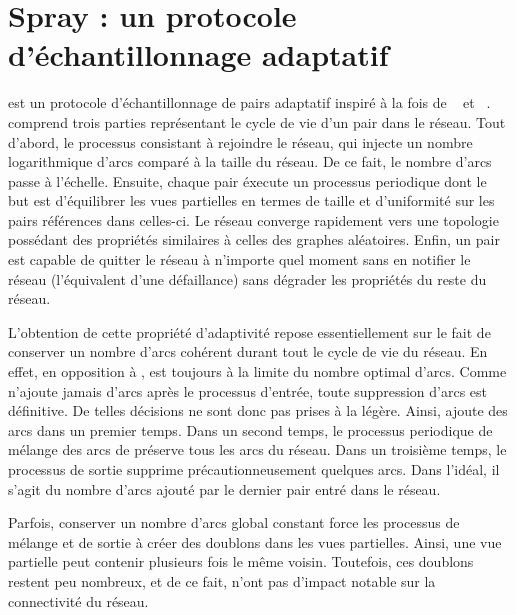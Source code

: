 
\chapter{Spray : un protocole d'échantillonnage adaptatif}
\label{net:chap:spray}
\minitoc

\SPRAY est un protocole d'échantillonnage de pairs adaptatif inspiré à la fois
de \SCAMP~\cite{ganesh2003peer} et \CYCLON~\cite{voulgaris2005cyclon}. \SPRAY
comprend trois parties représentant le cycle de vie d'un pair dans le
réseau. Tout d'abord, le processus consistant à rejoindre le réseau, qui injecte
un nombre logarithmique d'arcs comparé à la taille du réseau. De ce fait, le
nombre d'arcs passe à l'échelle. Ensuite, chaque pair éxecute un processus
periodique dont le but est d'équilibrer les vues partielles en termes de taille
et d'uniformité sur les pairs références dans celles-ci. Le réseau converge
rapidement vers une topologie possédant des propriétés similaires à celles des
graphes aléatoires. Enfin, un pair est capable de quitter le réseau à n'importe
quel moment sans en notifier le réseau (l'équivalent d'une défaillance) sans
dégrader les propriétés du reste du réseau.

L'obtention de cette propriété d'adaptivité repose essentiellement sur le fait
de conserver un nombre d'arcs cohérent durant tout le cycle de vie du réseau.
En effet, en opposition à \CYCLON, \SPRAY est toujours à la limite du nombre
optimal d'arcs. Comme \SPRAY n'ajoute jamais d'arcs après le processus d'entrée,
toute suppression d'arcs est définitive. De telles décisions ne sont donc pas
prises à la légère. Ainsi, \SPRAY ajoute des arcs dans un premier temps. Dans un
second temps, le processus periodique de mélange des arcs de \SPRAY préserve
tous les arcs du réseau.  Dans un troisième temps, le processus de sortie
supprime précautionneusement quelques arcs. Dans l'idéal, il s'agit du nombre
d'arcs ajouté par le dernier pair entré dans le réseau.

Parfois, conserver un nombre d'arcs global constant force les processus de
mélange et de sortie à créer des doublons dans les vues partielles. Ainsi, une
vue partielle peut contenir plusieurs fois le même voisin. Toutefois, ces
doublons restent peu nombreux, et de ce fait, n'ont pas d'impact notable sur la
connectivité du réseau.


